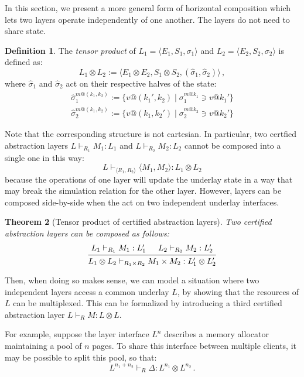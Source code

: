 \documentclass[11pt,oneside,draft]{book}
\newtheorem{theorem}{Theorem}[chapter]
\theoremstyle{definition}
\newtheorem{definition}[theorem]{Definition}
\begin{document}
In this section,
we present a more general form of horizontal composition
which lets two layers operate independently of one another.
The layers do not need to share state.

\begin{definition}
The \emph{tensor product} of
$L_1 = \langle E_1, S_1, \sigma_1 \rangle$ and
$L_2 = \langle E_2, S_2, \sigma_2 \rangle$
is defined as:
\[
  L_1 \otimes L_2 := \langle
    E_1 \otimes E_2,
    S_1 \otimes S_2,
    (\hat{\sigma}_1, \hat{\sigma}_2)
  \rangle \,,
\]
where $\hat{\sigma}_1$ and $\hat{\sigma}_2$
act on their respective halves of the state:
\begin{gather*}
  \hat{\sigma}_1^{m@(k_1, k_2)} :=
    \{ v@(k_1', k_2) \mid \sigma_1^{m@k_1} \ni v@k_1' \} \\
  \hat{\sigma}_2^{m@(k_1, k_2)} :=
    \{ v@(k_1, k_2') \mid \sigma_2^{m@k_2} \ni v@k_2' \}
\end{gather*}
\end{definition}

Note that the corresponding structure is not cartesian.
In particular, two certfied abstraction layers
$L \vdash_{R_1} M_1 : L_1$ and
$L \vdash_{R_2} M_2 : L_2$
cannot be composed into a single one in this way:
\[
  L \vdash_{\langle R_1, R_2 \rangle} \langle M_1, M_2 \rangle : L_1
\otimes L_2
\]
because the operations of one layer will update the underlay state
in a way that may break the simulation relation for the other layer.
However, layers can be composed side-by-side
when the act on two independent underlay interfaces.

\begin{theorem}[Tensor product of certified abstraction layers]
Two certified abstraction layers can be composed as follows:
\[
  \begin{prooftree}
    \hypo{L_1 \vdash_{R_1} M_1 : L_1'}
    \hypo{L_2 \vdash_{R_2} M_2 : L_2'}
    \infer2{L_1 \otimes L_2 \vdash_{R_1 \times R_2}
      M_1 \times M_2 : L_1' \otimes L_2'}
  \end{prooftree}
\]
\end{theorem}

Then,
when doing so makes sense,
we can model a situation where
two independent layers access a common underlay $L$,
by showing that the resources of $L$
can be multiplexed.
This can be formalized
by introducing a third certified abstraction layer
$L \vdash_R M : L \otimes L$.

For example,
suppose the layer interface $L^n$
describes a memory allocator maintaining a pool of $n$ pages.
To share this interface between multiple clients,
it may be possible to split this pool,
so that:
\[
  L^{n_1 + n_2} \vdash_R \Delta : L^{n_1} \otimes L^{n_2}
  \,.
\]
\end{document}
